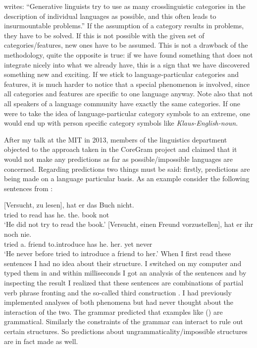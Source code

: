 \citet[]{Haspelmath2010b} writes: ``Generative linguists try to use as many crosslinguistic
  categories in the description of individual languages as possible, and this often leads to
  insurmountable problems.'' If the assumption of a category results in problems, they have to be
solved. If this is not possible with the given set of categories/features, new ones have to be
assumed. This is not a drawback of the methodology, quite the opposite is true: if we have found
something that does not integrate nicely into what we already have, this is a sign that we have discovered
something new and exciting. %
If we stick to language-particular categories and features, it is much
harder to notice that a special phenomenon is involved, since all categories and features are
specific to one language anyway. Note also that not all speakers of a language community have
exactly the same categories. If one were to take the idea of language-particular category symbols to
an extreme, one would end up with person specific category symbols like \emph{Klaus-English-noun}.

\largerpage
After my talk at the MIT in 2013, members of the linguistics department objected to the
approach taken in the CoreGram project and claimed that it would not make any predictions as far as possible/impossible languages
are concerned. Regarding predictions two things must be said: firstly, predictions are being made on a
language particular basis. As an example consider the following sentences from \citet{Netter91}:


\eal
\ex 
\gll {}[Versucht, zu lesen], hat er das Buch nicht.\\
       \spacebr{}tried to read has he.\nom{} the.\acc{} book not\\
\glt `He did not try to read the book.'
\ex 
\gll {}[Versucht, einen Freund vorzustellen], hat er ihr noch nie.\\
       \spacebr{}tried a.\acc{} friend to.introduce has he.\nom{} her.\dat{} yet never\\
\glt `He never before tried to introduce a friend to her.'
\zl
When I first read these sentences I had no idea about their structure. I switched on my computer and typed them
in and within milliseconds I got an analysis of the sentences and by inspecting the result I realized
that these sentences are combinations of partial verb phrase fronting and the so-called third
construction \citep[]{Mueller99a}. I had previously implemented analyses of both phenomena
but had never thought about the interaction of
the two. The grammar predicted that examples like () are grammatical. Similarly the
constraints of the grammar can interact to rule out certain structures. So predictions about
ungrammaticality/impossible structures are in fact made as well.

